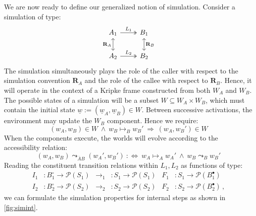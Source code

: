 \documentclass[acmsmall,screen,review,anonymous]{acmart}
\newcommand{\que}{\circ}
\newcommand{\ans}{\bullet}
\newcommand{\intl}[1]{\underline{#1}}
\begin{document}
We are now ready to define our generalized notion of simulation.
Consider a simulation of type:
\[
\begin{tikzcd}
  A_1 \ar[r, twoheadrightarrow, "L_1"] \ar[d, leftrightarrow, "\mathbf{R}_A"'] &
  B_1 \ar[d, leftrightarrow, "\mathbf{R}_B"] \\
  A_2 \ar[r, twoheadrightarrow, "L_2"] & B_2
\end{tikzcd}
\]
The simulation simultaneously
plays the role of the caller with respect to
the simulation convention $\mathbf{R}_A$ and
the role of the callee with respect to $\mathbf{R}_B$.
Hence,
it will operate in the context of a Kripke frame
constructed from both $W_A$ and $W_B$.
The possible states of a simulation will be a subset
$W \subseteq W_A \times W_B$,
which must contain
the initial state $\intl{w} := (\intl{w}_A, \intl{w}_B) \in W$.
Between successive activations,
the environment may update the $W_B$ component.
Hence we require:
\[
  (w_A, w_B) \in W \:\wedge\:
  w_B \mapsto_B w_B' \:\Rightarrow\:
  (w_A, w_B') \in W
\]
When the components execute,
the worlds will evolve according to
the accessibility relation:
\[
  (w_A, w_B) \leadsto_{\bar{A}B} (w_A', w_B') \::\Leftrightarrow\:
  w_A \mapsto_A w_A' \:\wedge\: w_B \leadsto_B w_B'
\]
Reading the constituent transition relations
within $L_1, L_2$ as functions of type:
\begin{align*}
  I_1 &: B_1^\que \rightarrow \mathcal{P}(S_1) &
  {\rightarrow_1} &: S_1 \rightarrow \mathcal{P}(S_1) &
  F_1 &: S_1 \rightarrow \mathcal{P}(B_1^\ans)
  \\
  I_2 &: B_2^\que \rightarrow \mathcal{P}(S_2) &
  {\rightarrow_2} &: S_2 \rightarrow \mathcal{P}(S_2) &
  F_2 &: S_2 \rightarrow \mathcal{P}(B_2^\ans)
  \,,
\end{align*}
we can formulate the simulation properties for internal steps
as shown in \autoref{fig:simint}.
\end{document}
